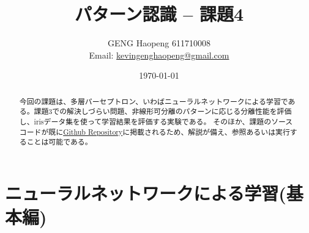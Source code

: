 \documentclass[ %
  uplatex,%
  papersize%
]{jsarticle}
\title{パターン認識 -- 課題4}
\author{\large GENG Haopeng 611710008 \\ \small Email:  \href{mailto:kevingenghaopeng@gmail.com}{kevingenghaopeng@gmail.com}}
\affil{\small Department of Intelligent Systems, Nagoya University}
\date{\today}
\begin{document}
\maketitle

\begin{abstract}
今回の課題は、多層パーセプトロン、いわばニューラルネットワークによる学習である。課題3での解決しづらい問題、非線形可分離のパターンに応じる分離性能を評価し、irisデータ集を使って学習結果を評価する実験である。
そのほか、課題のソースコードが既に\href{https://github.com/Secondtonumb/pattern_recogn/tree/master/pattern04}{Github Repository}に掲載されるため、解説が備え、参照あるいは実行することは可能である。
\end{abstract}

\section{ニューラルネットワークによる学習(基本編)}
\end{document}

